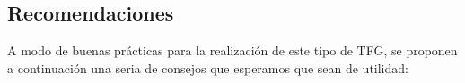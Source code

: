 

\subsection{Recomendaciones}\label{tfx_inves_ss_recomendaiones}

A modo de buenas prácticas para la realización de este tipo de TFG, se proponen a continuación una seria de consejos que esperamos que sean de utilidad:

